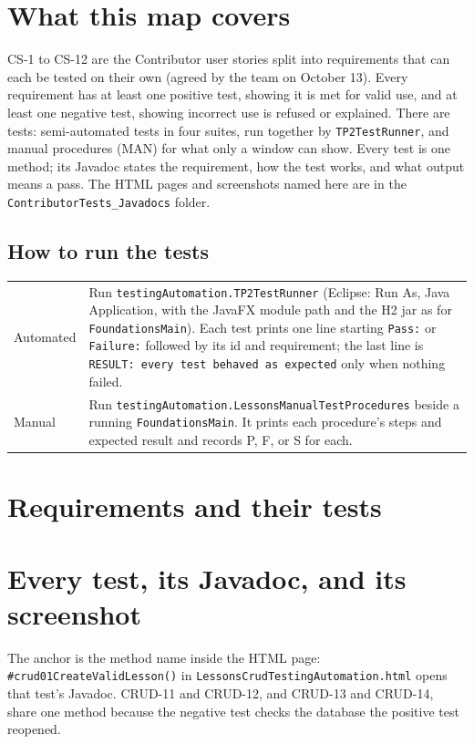 \documentclass[10pt]{article}
\begin{document}

\section*{What this map covers}
CS-1 to CS-12 are the Contributor user stories split into requirements that can each be tested
on their own (agreed by the team on October 13). Every requirement has at least one positive
test, showing it is met for valid use, and at least one negative test, showing incorrect use is
refused or explained. There are \ntotal{} tests: \nauto{} semi-automated tests in four suites,
run together by \texttt{TP2TestRunner}, and \nman{} manual procedures (MAN) for what only a
window can show. Every test is one method; its Javadoc states the requirement, how the test
works, and what output means a pass. The HTML pages and screenshots named here are in the
\texttt{ContributorTests\_Javadocs} folder.

\subsection*{How to run the tests}
\begin{tabularx}{\linewidth}{@{}l X@{}}
Automated & Run \texttt{testingAutomation.TP2TestRunner} (Eclipse: Run As, Java Application, with
  the JavaFX module path and the H2 jar as for \texttt{FoundationsMain}). Each test prints one line
  starting \texttt{Pass:} or \texttt{Failure:} followed by its id and requirement; the last line is
  \texttt{RESULT: every test behaved as expected} only when nothing failed. \\
Manual & Run \texttt{testingAutomation.LessonsManualTestProcedures} beside a running
  \texttt{FoundationsMain}. It prints each procedure's steps and expected result and records
  P, F, or S for each. \\
\end{tabularx}

\section*{Requirements and their tests}
\begin{small}

\end{small}

\section*{Every test, its Javadoc, and its screenshot}
The anchor is the method name inside the HTML page: \texttt{\#crud01CreateValidLesson()} in
\texttt{LessonsCrudTestingAutomation.html} opens that test's Javadoc. CRUD-11 and CRUD-12, and CRUD-13 and CRUD-14, share one method because
the negative test checks the database the positive test reopened.
\end{document}
